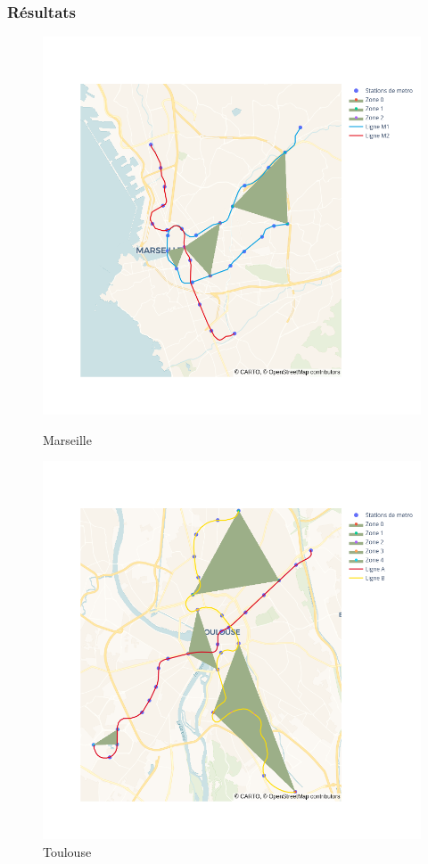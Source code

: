 \documentclass{beamer}
\begin{document}
\begin{frame}
    \frametitle{Résultats}
    \begin{figure}[h]
        \begin{minipage}[c]{.42\linewidth}
            \centering
            \includegraphics[width=1.3\textwidth]{../../Code/images/marseille.png}
            \caption{Marseille}
        \end{minipage}
        \hfill
        \begin{minipage}[c]{.42\linewidth}
            \centering
            \includegraphics[width=1.3\textwidth]{../../Code/images/toulouse.png}
            \caption{Toulouse}
        \end{minipage}
    \end{figure}
\end{frame}
\end{document}
